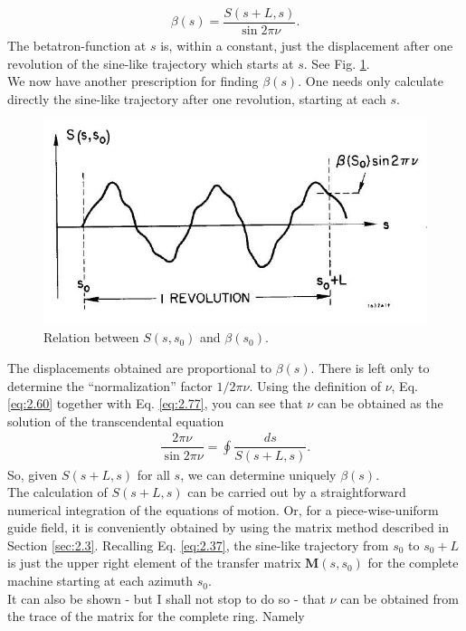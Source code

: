 \begin{align}\label{eq:2.77}
	\beta(s)=\dfrac{S(s+L,s)}{\sin2\pi\nu}.
\end{align}
The betatron-function at $s$ is, within a constant, just the displacement after one revolution
 of the sine-like trajectory which starts at $s$. See Fig. \ref{fig:fig19}.\\
We now have another prescription for finding $\beta(s)$. One needs only calculate directly the sine-like trajectory after one revolution, starting at each $s$.\\
\begin{figure}[!htb]
	\centering
	\includegraphics[width=0.8\linewidth]{./Figuras/fig19.jpeg}
	\caption{Relation between $S(s, s_0)$ and $\beta(s_0)$.}
	\label{fig:fig19}
\end{figure}
The displacements obtained are proportional to $\beta(s)$. There is left only to determine the ``normalization'' factor $1/2\pi\nu$. Using the definition of $\nu$, Eq. \eqref{eq:2.60} together with Eq. \eqref{eq:2.77}, you can see that $\nu$ can be obtained as the solution of the transcendental equation
\begin{align}
	\dfrac{2\pi\nu}{\sin{2\pi\nu}}=\oint\dfrac{ds}{S(s+L,s)}.
\end{align}
So, given $S(s+L, s)$ for all $s$, we can determine uniquely $\beta(s)$.\\
The calculation of $S(s +L, s)$ can be carried out by a straightforward numerical integration
 of the equations of motion. Or, for a piece-wise-uniform guide field, it is conveniently obtained by using the matrix method described in Section \ref{sec:2.3}. Recalling Eq. \eqref{eq:2.37}, the sine-like trajectory from $s_0$ to $s_0 + L$ is just the upper right element of the transfer matrix $\bm{M}(s, s_0)$ for the complete machine starting at each azimuth $s_0$.\\
It can also be shown - but I shall not stop to do so - that $\nu$ can be obtained from the trace of the matrix for the complete ring. Namely
